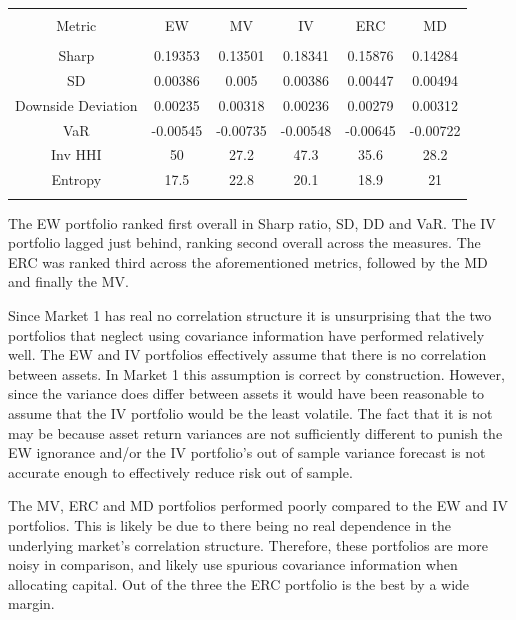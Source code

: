 \documentclass[11pt,preprint, authoryear]{elsarticle}
\let\origtable\table
\let\endorigtable\endtable
\renewenvironment{table}[1][2] {
    \expandafter\origtable\expandafter[H]
} {
    \endorigtable
}
\numberwithin{equation}{section}
\numberwithin{figure}{section}
\numberwithin{table}{section}
\begin{document}
\begin{table}[!htbp] \centering 
  \caption{Market 1 - Portfolio Risk Metrics} 
  \label{rm1} 
\begin{tabular}{@{\extracolsep{5pt}} cccccc} 
\\[-1.8ex]\hline 
\hline \\[-1.8ex] 
Metric & EW & MV & IV & ERC & MD \\ 
\hline \\[-1.8ex] 
Sharp & 0.19353 & 0.13501 & 0.18341 & 0.15876 & 0.14284 \\ 
SD & 0.00386 & 0.005 & 0.00386 & 0.00447 & 0.00494 \\ 
Downside Deviation & 0.00235 & 0.00318 & 0.00236 & 0.00279 & 0.00312 \\ 
VaR & -0.00545 & -0.00735 & -0.00548 & -0.00645 & -0.00722 \\ 
Inv HHI & 50 & 27.2 & 47.3 & 35.6 & 28.2 \\ 
Entropy & 17.5 & 22.8 & 20.1 & 18.9 & 21 \\ 
\hline \\[-1.8ex] 
\end{tabular} 
\end{table}

The EW portfolio ranked first overall in Sharp ratio, SD, DD and VaR.
The IV portfolio lagged just behind, ranking second overall across the
measures. The ERC was ranked third across the aforementioned metrics,
followed by the MD and finally the MV.

Since Market 1 has real no correlation structure it is unsurprising that
the two portfolios that neglect using covariance information have
performed relatively well. The EW and IV portfolios effectively assume
that there is no correlation between assets. In Market 1 this assumption
is correct by construction. However, since the variance does differ
between assets it would have been reasonable to assume that the IV
portfolio would be the least volatile. The fact that it is not may be
because asset return variances are not sufficiently different to punish
the EW ignorance and/or the IV portfolio's out of sample variance
forecast is not accurate enough to effectively reduce risk out of
sample.

The MV, ERC and MD portfolios performed poorly compared to the EW and IV
portfolios. This is likely be due to there being no real dependence in
the underlying market's correlation structure. Therefore, these
portfolios are more noisy in comparison, and likely use spurious
covariance information when allocating capital. Out of the three the ERC
portfolio is the best by a wide margin.
\end{document}
